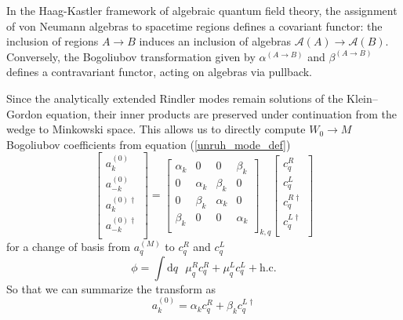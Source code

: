 \documentclass[12pt,a4paper]{article}
\newcommand{\dv}[1]{\mathrm{d} #1 \text{ }}
\begin{document}
In the Haag-Kastler framework of algebraic quantum field theory, the assignment of von Neumann algebras to spacetime regions defines a covariant functor: the inclusion of regions $A \rightarrow B$ induces an inclusion of algebras $\mathcal{A}(A) \rightarrow \mathcal{A}(B)$. Conversely, the Bogoliubov transformation given by $\alpha^{(A \rightarrow B)}$ and $\beta^{(A \rightarrow B)}$ defines a contravariant functor, acting on algebras via pullback. 

Since the analytically extended Rindler modes remain solutions of the Klein–Gordon equation, their inner products are preserved under continuation from the wedge to Minkowski space.  This allows us to directly compute $W_0 \rightarrow M$ Bogoliubov coefficients from equation (\ref{unruh_mode_def})
\begin{equation}
  \left[ \begin{array}{l}
    a^{(0)}_k \\
    a^{(0)}_{-k} \\
    \hline
    a^{(0)\dagger}_k \\
    a^{(0)\dagger}_{-k} \\
 \end{array} \right] = 
  \left[
\begin{array}{rr|rr}
    \alpha_k &       0   &  0       & \beta_k \\
    0        & \alpha_k & \beta_k & 0 \\
    \hline
    0        & \beta_k   & \alpha_k & 0 \\
    \beta_k &    0      &   0      & \alpha_k \\
\end{array} \right]_{k,q}
\left[ \begin{array}{l}
    c^R_q \\
    c^L_q \\
    \hline
    c^{R\dagger}_q \\
    c^{L\dagger}_q \\
 \end{array} \right]
\end{equation}
for a change of basis from $a^{(M)}_q$ to $c^R_q$ and $c^L_q$
\begin{equation}
  \phi = \int \dv{q} \mu_q^R c_q^R + \mu_q^L c_q^L + \text{h.c.}
  \label{c_ladder}
\end{equation}
So that we can summarize the transform as
\begin{equation}
  a_k^{(0)} = \alpha_k c_q^R + \beta_k c_q^{L\dagger}
\label{a_in_c}
\end{equation}
\end{document}
